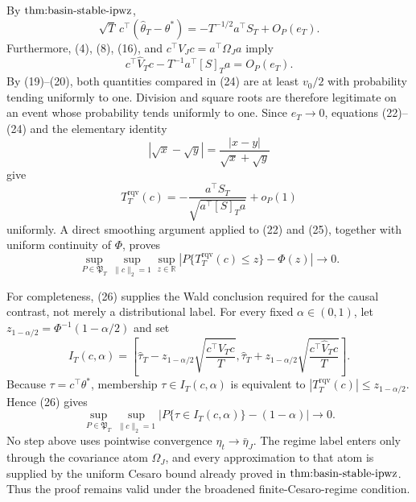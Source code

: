 By \(\textnormal{thm:basin-stable-ipwz}\),
\[
 \sqrt T\,c^\top(\widehat\theta_T-\theta^*)
 =-T^{-1/2}a^\top S_T+O_P(e_T). \tag{23}
\]
Furthermore, (4), (8), (16), and \(c^\top V_Jc=a^\top\Omega_Ja\) imply
\[
 c^\top\widehat V_Tc-T^{-1}a^\top[S]_Ta=O_P(e_T). \tag{24}
\]
By (19)--(20), both quantities compared in (24) are at least \(v_0/2\) with probability tending uniformly to one. Division and square roots are therefore legitimate on an event whose probability tends uniformly to one. Since \(e_T\to0\), equations (22)--(24) and the elementary identity
\[
 |\sqrt x-\sqrt y|=\frac{|x-y|}{\sqrt x+\sqrt y}
\]
give
\[
 T_T^{\mathrm{rqv}}(c)
 =-\frac{a^\top S_T}{\sqrt{a^\top[S]_Ta}}+o_P(1) \tag{25}
\]
uniformly. A direct smoothing argument applied to (22) and (25), together with uniform continuity of \(\Phi\), proves
\[
 \sup_{P\in\mathfrak P_T}\sup_{\|c\|_2=1}\sup_{z\in\mathbb R}
 \left|P\{T_T^{\mathrm{rqv}}(c)\le z\}-\Phi(z)\right|
 \longrightarrow0. \tag{26}
\]

For completeness, (26) supplies the Wald conclusion required for the causal contrast, not merely a distributional label. For every fixed \(\alpha\in(0,1)\), let \(z_{1-\alpha/2}=\Phi^{-1}(1-\alpha/2)\) and set
\[
 I_T(c,\alpha)=
 \left[\widehat\tau_T-z_{1-\alpha/2}
       \sqrt{\frac{c^\top\widehat V_Tc}{T}},
       \widehat\tau_T+z_{1-\alpha/2}
       \sqrt{\frac{c^\top\widehat V_Tc}{T}}\right].
\]
Because \(\tau=c^\top\theta^*\), membership \(\tau\in I_T(c,\alpha)\) is equivalent to \(|T_T^{\mathrm{rqv}}(c)|\le z_{1-\alpha/2}\). Hence (26) gives
\[
 \sup_{P\in\mathfrak P_T}\sup_{\|c\|_2=1}
 \left|P\{\tau\in I_T(c,\alpha)\}-(1-\alpha)\right|
 \longrightarrow0. \tag{27}
\]
No step above uses pointwise convergence \(\eta_t\to\bar\eta_J\). The regime label enters only through the covariance atom \(\Omega_J\), and every approximation to that atom is supplied by the uniform Cesaro bound already proved in \(\textnormal{thm:basin-stable-ipwz}\). Thus the proof remains valid under the broadened finite-Cesaro-regime condition.
